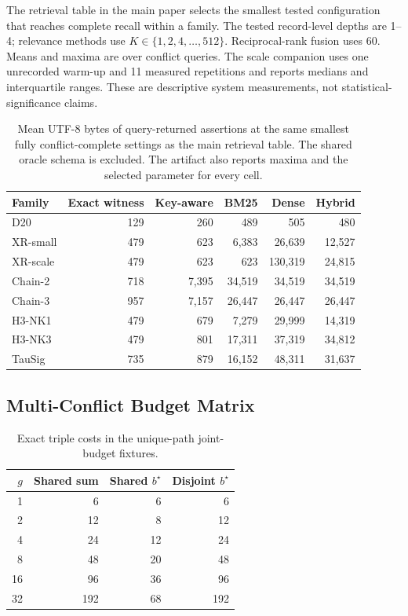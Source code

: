 \documentclass[letterpaper]{article}
\begin{document}
The retrieval table in the main paper selects the smallest tested
configuration that reaches complete recall within a family.  The tested
record-level depths are 1--4; relevance methods use
$K\in\{1,2,4,\ldots,512\}$.  Reciprocal-rank fusion uses 60.  Means and maxima
are over conflict queries.  The scale companion uses one unrecorded warm-up
and 11 measured repetitions and reports medians and interquartile ranges.
These are descriptive system measurements, not statistical-significance
claims.

\begin{table}[t]
\centering
\scriptsize
\setlength{\tabcolsep}{1.4pt}
\begin{tabular}{lrrrrr}
\toprule
Family & Exact witness & Key-aware & BM25 & Dense & Hybrid \\
\midrule
D20       & 129 & 260 & 489 & 505 & 480 \\
XR-small  & 479 & 623 & 6,383 & 26,639 & 12,527 \\
XR-scale  & 479 & 623 & 623 & 130,319 & 24,815 \\
Chain-2   & 718 & 7,395 & 34,519 & 34,519 & 34,519 \\
Chain-3   & 957 & 7,157 & 26,447 & 26,447 & 26,447 \\
H3-NK1    & 479 & 679 & 7,279 & 29,999 & 14,319 \\
H3-NK3    & 479 & 801 & 17,311 & 37,319 & 34,812 \\
TauSig    & 735 & 879 & 16,152 & 48,311 & 31,637 \\
\bottomrule
\end{tabular}
\caption{Mean UTF-8 bytes of query-returned assertions at the same smallest
fully conflict-complete settings as the main retrieval table.  The shared
oracle schema is excluded.  The artifact also reports maxima and the selected
parameter for every cell.}
\label{tab:bytes}
\end{table}

\subsection{Multi-Conflict Budget Matrix}

\begin{table}[t]
\centering
\small
\begin{tabular}{rrrr}
\toprule
$g$ & Shared sum & Shared $b^\star$ & Disjoint $b^\star$ \\
\midrule
1 & 6 & 6 & 6 \\
2 & 12 & 8 & 12 \\
4 & 24 & 12 & 24 \\
8 & 48 & 20 & 48 \\
16 & 96 & 36 & 96 \\
32 & 192 & 68 & 192 \\
\bottomrule
\end{tabular}
\caption{Exact triple costs in the unique-path joint-budget fixtures.}
\end{table}
\end{document}
